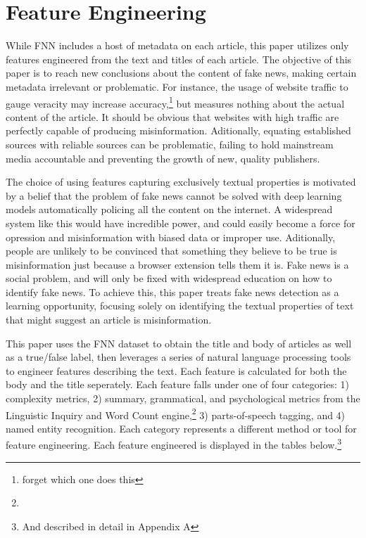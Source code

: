 \documentclass[../thesis.tex]{subfiles}
\begin{document}
\section{Feature Engineering}

While FNN includes a host of metadata on each article, this paper utilizes only features engineered from the text and titles of each article. The objective of this paper is to reach new conclusions about the content of fake news, making certain metadata irrelevant or problematic. For instance, the usage of website traffic to gauge veracity may increase accuracy,\footnote{forget which one does this} but measures nothing about the actual content of the article. It should be obvious that websites with high traffic are perfectly capable of producing misinformation. Aditionally, equating established sources with reliable sources can be problematic, failing to hold mainstream media accountable and preventing the growth of new, quality publishers.
 
The choice of using features capturing exclusively textual properties is motivated by a belief that the problem of fake news cannot be solved with deep learning models automatically policing all the content on the internet. A widespread system like this would have incredible power, and could easily become a force for opression and misinformation with biased data or improper use. Aditionally, people are unlikely to be convinced that something they believe to be true is misinformation just because a browser extension tells them it is. Fake news is a social problem, and will only be fixed with widespread education on how to identify fake news. To achieve this, this paper treats fake news detection as a learning opportunity, focusing solely on identifying the textual properties of text that might suggest an article is misinformation.

This paper uses the FNN dataset to obtain the title and body of articles as well as a true/false label, then leverages a series of natural language processing tools to engineer features describing the text. Each feature is calculated for both the body and the title seperately. Each feature falls under one of four categories: 1) complexity metrics, 2) summary, grammatical, and psychological metrics from the Linguistic Inquiry and Word Count engine,\footnote{} 3) parts-of-speech tagging, and 4) named entity recognition. Each category represents a different method or tool for feature engineering. Each feature engineered is displayed in the tables below.\footnote{And described in detail in Appendix A}
\end{document}
